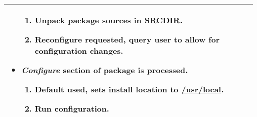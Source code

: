 \begin{tabularx}{\linewidth}{|l|X|}
\begin{minipage}{\linewidth}
\begin{itemize}
\begin{enumerate}
      \item Unpack package sources in \textbf{SRCDIR}.
      \item Reconfigure requested, query user to allow for configuration changes.
    \end{enumerate}
    \item \emph{Configure} section of package is processed.
    \begin{enumerate}
      \item Default used, sets install location to \textbf{\url{/usr/local}}.
      \item Run \textbf{configuration}.
    \end{enumerate}
  \end{itemize}
  \vspace{0.05em}
\end{minipage}
\\
\hline 
\end{tabularx}

